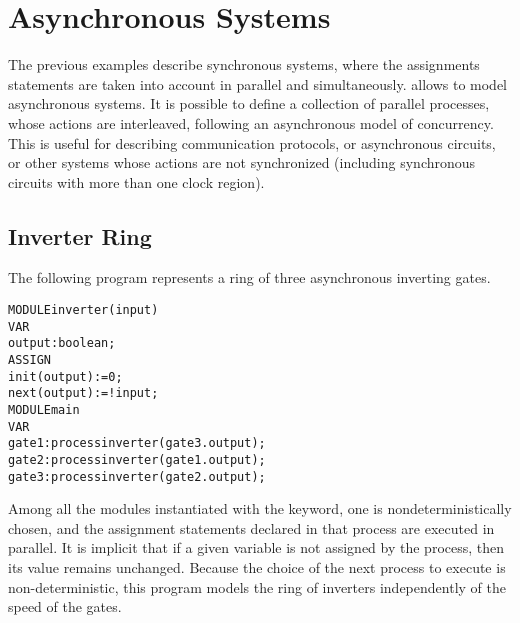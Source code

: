 \section{Asynchronous Systems}
\label{Asynchronous Systems}

The previous examples describe synchronous systems, where the
assignments statements are taken into account in parallel and
simultaneously. \nusmv allows to model asynchronous systems.  It
is possible to define a collection of parallel processes, whose actions
are interleaved, following an asynchronous model of concurrency. This
is useful for describing communication protocols, or asynchronous
circuits, or other systems whose actions are not synchronized (including
synchronous circuits with more than one clock region).


\subsection{Inverter Ring}
\label{Inverter Ring}

The following program represents a ring of three asynchronous inverting
gates.\\
\begin{alltt}
MODULE inverter(input)
 VAR
   output : boolean;
 ASSIGN
   init(output) := 0;
   next(output) := !input;
MODULE main
 VAR
   gate1 : process inverter(gate3.output);
   gate2 : process inverter(gate1.output);
   gate3 : process inverter(gate2.output);
\end{alltt}
Among all the modules instantiated with the  keyword, one
is nondeterministically chosen, and the assignment statements declared
in that process are executed in parallel. It is implicit that if a given
variable is not assigned by the process, then its value remains
unchanged. Because the choice of the next process to execute is
non-deterministic, this program models the ring of inverters
independently of the speed of the gates. 

